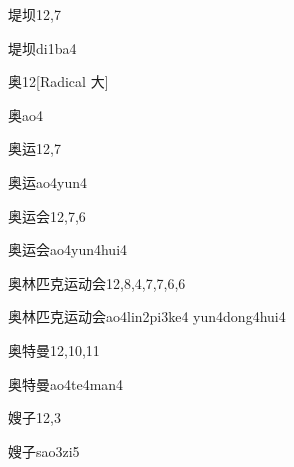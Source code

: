 \begin{entry}{堤坝}{12,7}
  \begin{phonetics}{堤坝}{di1ba4}
  \end{phonetics}
\end{entry}

\begin{entry}{奥}{12}[Radical 大]
  \begin{phonetics}{奥}{ao4}
  \end{phonetics}
\end{entry}

\begin{entry}{奥运}{12,7}
  \begin{phonetics}{奥运}{ao4yun4}
  \end{phonetics}
\end{entry}

\begin{entry}{奥运会}{12,7,6}
  \begin{phonetics}{奥运会}{ao4yun4hui4}
  \end{phonetics}
\end{entry}

\begin{entry}{奥林匹克运动会}{12,8,4,7,7,6,6}
  \begin{phonetics}{奥林匹克运动会}{ao4lin2pi3ke4 yun4dong4hui4}
  \end{phonetics}
\end{entry}

\begin{entry}{奥特曼}{12,10,11}
  \begin{phonetics}{奥特曼}{ao4te4man4}
  \end{phonetics}
\end{entry}

\begin{entry}{嫂子}{12,3}
  \begin{phonetics}{嫂子}{sao3zi5}
  \end{phonetics}
\end{entry}

